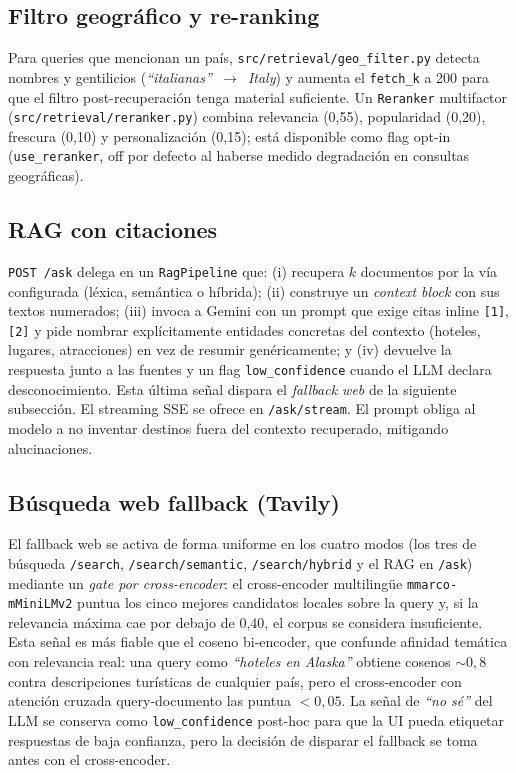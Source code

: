 \documentclass[runningheads,a4paper]{llncs}
\begin{document}
\subsection{Filtro geogr\'afico y re-ranking}

Para queries que mencionan un pa\'is, \texttt{src/retrieval/geo\_filter.py} detecta nombres y gentilicios (\emph{``italianas''~$\to$~Italy}) y aumenta el \texttt{fetch\_k} a 200 para que el filtro post-recuperaci\'on tenga material suficiente. Un \texttt{Reranker} multifactor (\texttt{src/retrieval/reranker.py}) combina relevancia (0{,}55), popularidad (0{,}20), frescura (0{,}10) y personalizaci\'on (0{,}15); est\'a disponible como flag opt-in (\texttt{use\_reranker}, off por defecto al haberse medido degradaci\'on en consultas geogr\'aficas).

\subsection{RAG con citaciones}

\texttt{POST /ask} delega en un \texttt{RagPipeline} que: (i) recupera $k$ documentos por la v\'ia configurada (l\'exica, sem\'antica o h\'ibrida); (ii) construye un \emph{context block} con sus textos numerados; (iii) invoca a Gemini con un prompt que exige citas inline \texttt{[1]}, \texttt{[2]} y pide nombrar expl\'icitamente entidades concretas del contexto (hoteles, lugares, atracciones) en vez de resumir gen\'ericamente; y (iv) devuelve la respuesta junto a las fuentes y un flag \texttt{low\_confidence} cuando el LLM declara desconocimiento. Esta \'ultima se\~nal dispara el \emph{fallback web} de la siguiente subsecci\'on. El streaming SSE se ofrece en \texttt{/ask/stream}. El prompt obliga al modelo a no inventar destinos fuera del contexto recuperado, mitigando alucinaciones.

\subsection{B\'usqueda web fallback (Tavily)}

El fallback web se activa de forma uniforme en los cuatro modos (los tres de b\'usqueda \texttt{/search}, \texttt{/search/semantic}, \texttt{/search/hybrid} y el RAG en \texttt{/ask}) mediante un \emph{gate por cross-encoder}: el cross-encoder multilingüe \texttt{mmarco-mMiniLMv2} puntua los cinco mejores candidatos locales sobre la query y, si la relevancia m\'axima cae por debajo de 0{,}40, el corpus se considera insuficiente. Esta se\~nal es m\'as fiable que el coseno bi-encoder, que confunde afinidad tem\'atica con relevancia real: una query como \emph{``hoteles en Alaska''} obtiene cosenos ${\sim}0{,}8$ contra descripciones tur\'isticas de cualquier pa\'is, pero el cross-encoder con atenci\'on cruzada query-documento las puntua ${<}0{,}05$. La señal de \emph{``no s\'e''} del LLM se conserva como \texttt{low\_confidence} post-hoc para que la UI pueda etiquetar respuestas de baja confianza, pero la decisi\'on de disparar el fallback se toma antes con el cross-encoder.
\end{document}
